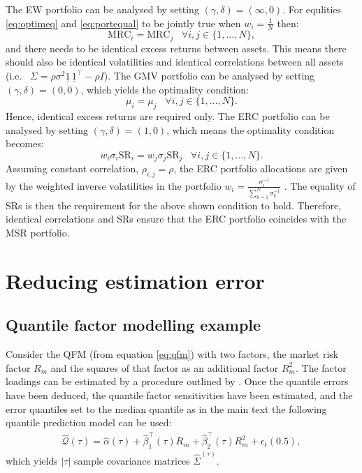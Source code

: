 \documentclass[
]{article}
\begin{document}
The EW portfolio can be analysed by setting \((\gamma, \delta) = (\infty, 0)\). For equlities
\eqref{eq:optimeq} and \eqref{eq:portequal} to be jointly true when \(w_i = \frac{1}{N}\) then:
\[\text{MRC}_i = \text{MRC}_j \;\;\; \forall i, j \in \{1, ..., N \},\]
and there needs to be identical excess returns between assets. This means there should also be
identical volatilities and identical correlations between all assets (i.e.~
\(\Sigma = \rho\sigma^2 \underline{1} \,\underline{1}^\intercal - \rho I\)). The GMV portfolio can be
analysed by setting \((\gamma, \delta) = (0,0)\), which yields the optimality condition:
\[\mu_i = \mu_j \;\;\; \forall i, j \in \{1, ..., N \}.\]
Hence, identical excess returns are required only. The ERC portfolio can be analysed by setting
\((\gamma, \delta) = (1, 0)\), which means the optimality condition becomes:
\[w_i \sigma_i \text{SR}_i = w_j \sigma_j \text{SR}_j \;\;\; \forall i, j \in \{1, ..., N \}.\]
Assuming constant correlation, \(\rho_{i, j} = \rho\), the ERC portfolio allocations are given by the
weighted inverse volatilities in the portfolio \(w_i = \frac{\sigma^{-1}_i}{\sum_{k = 1}^N \sigma^{-1}_k}\) \citet{MRT10}. The equality of SRs is then the requirement for the above shown condition to
hold. Therefore, identical correlations and SRs ensure that the ERC portfolio coincides with the MSR
portfolio.

\hypertarget{reducing-estimation-error}{%
\section{Reducing estimation error}\label{reducing-estimation-error}}

\hypertarget{qfmexample}{%
\subsection{Quantile factor modelling example}\label{qfmexample}}

Consider the QFM (from equation \eqref{eq:qfm}) with two factors, the market risk factor \(R_m\) and the
squares of that factor as an additional factor \(R_m^2\). The factor loadings can be estimated by a
procedure outlined by \citet{KB78}. Once the quantile errors have been deduced, the quantile factor
sensitivities have been estimated, and the error quantiles set to the median quantile as in the main
text the following quantile prediction model can be used:
\begin{align}
\hat{\mathcal{Q}}(\tau) = \hat{\alpha} (\tau) + \hat{\beta}_1^\intercal(\tau)R_m + \hat{\beta}_2^\intercal(\tau)R_m^2 + \epsilon_t(0.5),
\end{align}
which yields \(|\tau|\) sample covariance matrices \(\hat{\Sigma}^{(\tau)}\).
\end{document}
